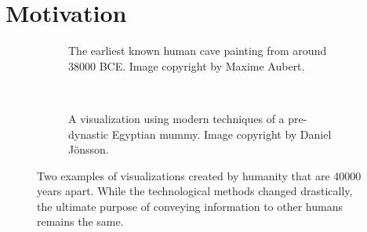\chapter{Motivation} \label{cha:motivation}
\begin{figure}[!b]
  \centering
  \begin{subfigure}{\abtwoimagewidth}
    \caption{The earliest known human cave painting from around 38000 BCE. Image copyright by Maxime Aubert.}
    \label{fig:motivation:vis:cave}
  \end{subfigure}
  ~
  \begin{subfigure}{\abtwoimagewidth}
    \caption{A visualization using modern techniques of a pre-dynastic Egyptian mummy. Image copyright by Daniel J\"onsson.}
    \label{fig:motivation:vis:modern}
  \end{subfigure}
  \caption{Two examples of visualizations created by humanity that are 40000 years apart.  While the technological methods changed drastically, the ultimate purpose of conveying information to other humans remains the same.}
  \label{fig:motivation:vis}
\end{figure}

